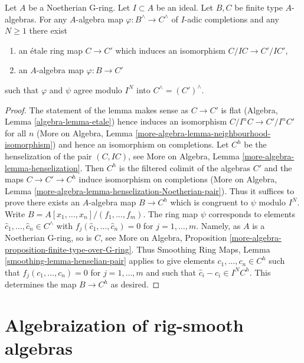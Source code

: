 \begin{lemma}
\label{lemma-fully-faithfulness}
Let $A$ be a Noetherian G-ring. Let $I \subset A$ be an ideal.
Let $B, C$ be finite type $A$-algebras. For any $A$-algebra map
$\varphi : B^\wedge \to C^\wedge$ of $I$-adic completions and any
$N \geq 1$ there exist
\begin{enumerate}
\item an \'etale ring map $C \to C'$ which induces
an isomorphism $C/IC \to C'/IC'$,
\item an $A$-algebra map $\varphi : B \to C'$
\end{enumerate}
such that $\varphi$ and $\psi$ agree modulo $I^N$
into $C^\wedge = (C')^\wedge$.
\end{lemma}

\begin{proof}
The statement of the lemma makes sense as $C \to C'$ is flat
(Algebra, Lemma \ref{algebra-lemma-etale}) hence induces an isomorphism
$C/I^nC \to C'/I^nC'$ for all $n$
(More on Algebra, Lemma \ref{more-algebra-lemma-neighbourhood-isomorphism})
and hence an isomorphism on completions.
Let $C^h$ be the henselization of the pair $(C, IC)$, see
More on Algebra, Lemma \ref{more-algebra-lemma-henselization}.
Then $C^h$ is the filtered colimit of the algebras $C'$
and the maps
$C \to C' \to C^h$ induce isomorphism on completions (More on Algebra,
Lemma \ref{more-algebra-lemma-henselization-Noetherian-pair}).
Thus it suffices to prove there exists an $A$-algebra map
$B \to C^h$ which is congruent to $\psi$ modulo $I^N$.
Write $B = A[x_1, \ldots, x_n]/(f_1, \ldots, f_m)$.
The ring map $\psi$ corresponds to elements
$\hat c_1, \ldots, \hat c_n \in C^\wedge$ with
$f_j(\hat c_1, \ldots, \hat c_n) = 0$ for $j = 1, \ldots, m$.
Namely, as $A$ is a Noetherian G-ring, so is $C$, see
More on Algebra, Proposition
\ref{more-algebra-proposition-finite-type-over-G-ring}.
Thus Smoothing Ring Maps,
Lemma \ref{smoothing-lemma-henselian-pair}
applies to give elements $c_1, \ldots, c_n \in C^h$ such
that $f_j(c_1, \ldots, c_n) = 0$ for $j = 1, \ldots, m$
and such that $\hat c_i - c_i \in I^NC^h$.
This determines the map $B \to C^h$ as desired.
\end{proof}







\section{Algebraization of rig-smooth algebras}
\label{section-algebraization-rig-smooth}

